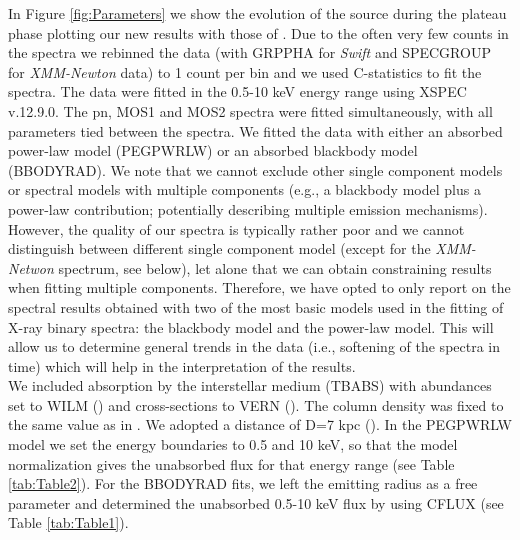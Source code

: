 \documentclass[a4paper,fleqn,usenatbib]{mnras}
\begin{document}
\indent In Figure \ref{fig:Parameters} we show the evolution of the source during the plateau phase plotting our new results with those of \cite{Wijnands2016}. Due to the often very few counts in the spectra we rebinned the data (with GRPPHA for \textit{Swift} and SPECGROUP for \textit{XMM-Newton} data) to 1 count per bin and we used C-statistics to fit the spectra. The data were fitted in the 0.5-10 keV energy range using XSPEC v.12.9.0. The pn, MOS1 and MOS2 spectra were fitted simultaneously, with all parameters tied between the spectra. We fitted the data with either an absorbed power-law model (PEGPWRLW) or an absorbed blackbody model (BBODYRAD). We note that we cannot exclude other single component models or spectral models with multiple components (e.g., a blackbody model plus a power-law contribution; potentially describing multiple emission mechanisms). However, the quality of our spectra is typically rather poor and we cannot distinguish between different single component model (except for the \textit{XMM-Netwon} spectrum, see below), let alone that we can obtain constraining results when fitting multiple components. Therefore, we have opted to only report on the spectral results obtained with two of the most basic models used in the fitting of X-ray binary spectra: the blackbody model and the power-law model. This will allow us to determine general trends in the data (i.e., softening of the spectra in time) which will help in the interpretation of the results.\\ \indent We included absorption by the interstellar medium (TBABS) with abundances set to WILM (\citealt{Wilms2000}) and cross-sections to VERN (\citealt{Verner1996}). The column density was fixed to the same value as in \citet[i.e., N$_{H}$=9$\times$10$^{21}$ cm$^{-2}$]{Wijnands2016}. We adopted a distance of D=7 kpc (\citealt{Negueruela2001}). In the PEGPWRLW model we set the energy boundaries to 0.5 and 10 keV, so that the model normalization gives the unabsorbed flux for that energy range (see Table \ref{tab:Table2}). For the BBODYRAD fits, we left the emitting radius as a free parameter and determined the unabsorbed 0.5-10 keV flux by using CFLUX (see Table \ref{tab:Table1}).\\
\end{document}
